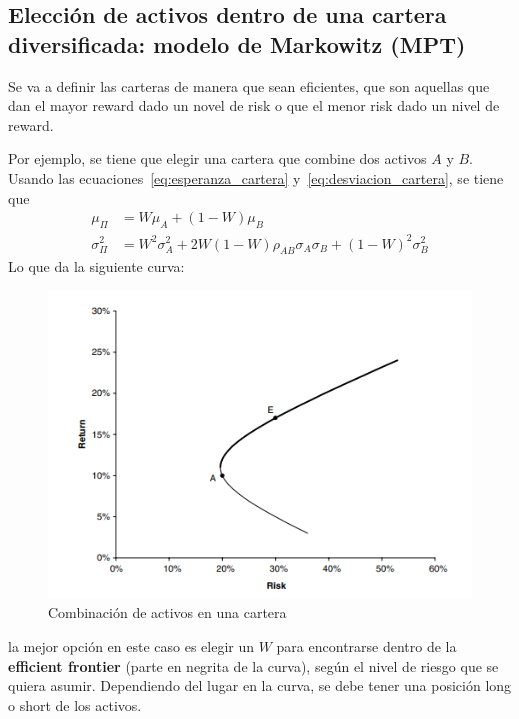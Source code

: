 \subsection{Elección de activos dentro de una cartera diversificada: modelo de Markowitz (MPT)}
Se va a definir las carteras de manera que sean eficientes, que son aquellas que dan el mayor reward dado un novel de risk o que el menor risk dado un nivel de reward. 

Por ejemplo, se tiene que elegir una cartera que combine dos activos $A$ y $B$. Usando las ecuaciones~\eqref{eq:esperanza_cartera} y~\eqref{eq:desviacion_cartera}, se tiene que
\begin{align*}
    \mu_\Pi &= W \mu_A + (1 - W) \mu_B \\
    \sigma^2_\Pi &= W^2 \sigma_A^2 + 2W(1-W)\rho_{AB}\sigma_A\sigma_B + (1-W)^2 \sigma_B^2
\end{align*}
Lo que da la siguiente curva:
\begin{figure}[H]
    \centering
    \includegraphics[width=0.65\linewidth]{Imagenes/14_Gestion_carteras/Combinacion_activos.png}
    \caption{Combinación de activos en una cartera}
\end{figure}
la mejor opción en este caso es elegir un $W$ para encontrarse dentro de la \textbf{efficient frontier} (parte en negrita de la curva), según el nivel de riesgo que se quiera asumir. Dependiendo del lugar en la curva, se debe tener una posición long o short de los activos.


